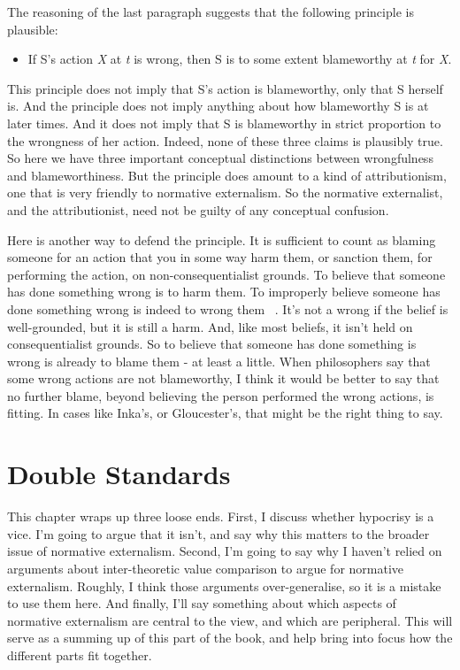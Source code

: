 The reasoning of the last paragraph suggests that the following principle is plausible:

\begin{itemize}
\item{} If S's action \emph{X} at \emph{t} is wrong, then S is to some extent blameworthy at \emph{t} for \emph{X}.

\end{itemize}
This principle does not imply that S's action is blameworthy, only that S herself is. And the principle does not imply anything about how blameworthy S is at later times. And it does not imply that S is blameworthy in strict proportion to the wrongness of her action. Indeed, none of these three claims is plausibly true. So here we have three important conceptual distinctions between wrongfulness and blameworthiness. But the principle does amount to a kind of attributionism, one that is very friendly to normative externalism. So the normative externalist, and the attributionist, need not be guilty of any conceptual confusion.

Here is another way to defend the principle. It is sufficient to count as blaming someone for an action that you in some way harm them, or sanction them, for performing the action, on non-consequentialist grounds. To believe that someone has done something wrong is to harm them. To improperly believe someone has done something wrong is indeed to wrong them ~\citep{BasuSchroeder2018}. It's not a wrong if the belief is well-grounded, but it is still a harm. And, like most beliefs, it isn't held on consequentialist grounds. So to believe that someone has done something is wrong is already to blame them - at least a little. When philosophers say that some wrong actions are not blameworthy, I think it would be better to say that no further blame, beyond believing the person performed the wrong actions, is fitting. In cases like \gls{Inka}'s, or \gls{Gloucester}'s, that might be the right thing to say.

\chapter{Double Standards}
\label{doublestandards}

This chapter wraps up three loose ends. First, I discuss whether hypocrisy is a vice. I'm going to argue that it isn't, and say why this matters to the broader issue of normative externalism. Second, I'm going to say why I haven't relied on arguments about inter-theoretic value comparison to argue for normative externalism. Roughly, I think those arguments over-generalise, so it is a mistake to use them here. And finally, I'll say something about which aspects of normative externalism are central to the view, and which are peripheral. This will serve as a summing up of this part of the book, and help bring into focus how the different parts fit together.


